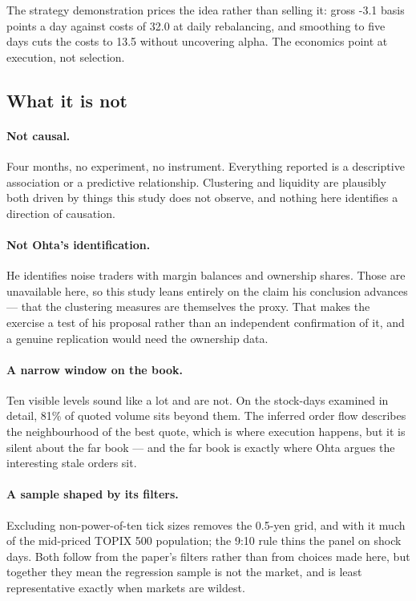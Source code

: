 The strategy demonstration prices the idea rather than selling it: gross -3.1 basis points a day against costs of 32.0 at daily rebalancing, and smoothing to five days cuts the costs to 13.5 without uncovering alpha. The economics point at execution, not selection.

\subsection{What it is not}

\paragraph{Not causal.}
Four months, no experiment, no instrument. Everything reported is a descriptive
association or a predictive relationship. Clustering and liquidity are plausibly
both driven by things this study does not observe, and nothing here identifies a
direction of causation.

\paragraph{Not Ohta's identification.}
He identifies noise traders with margin balances and ownership shares. Those are
unavailable here, so this study leans entirely on the claim his conclusion
advances --- that the clustering measures are themselves the proxy. That makes
the exercise a test of his proposal rather than an independent confirmation of
it, and a genuine replication would need the ownership data.

\paragraph{A narrow window on the book.}
Ten visible levels sound like a lot and are not. On the stock-days examined in
detail, 81\% of quoted volume sits beyond them. The inferred order flow
describes the neighbourhood of the best quote, which is where execution happens,
but it is silent about the far book --- and the far book is exactly where Ohta
argues the interesting stale orders sit.

\paragraph{A sample shaped by its filters.}
Excluding non-power-of-ten tick sizes removes the 0.5-yen grid, and with it much
of the mid-priced TOPIX 500 population; the 9:10 rule thins the panel on
shock days. Both follow from the paper's filters rather than from choices made
here, but together they mean the regression sample is not the market, and is
least representative exactly when markets are wildest.

